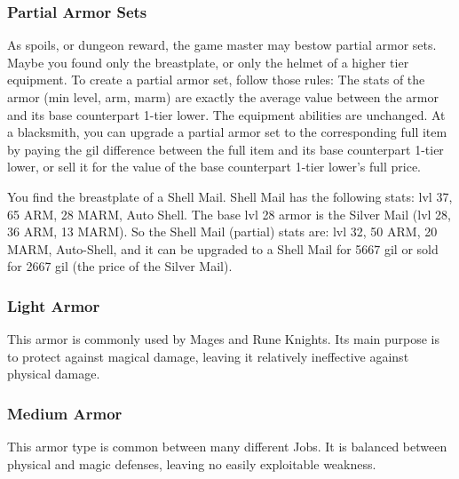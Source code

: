 \begin{multicols}{2}
\subsubsection{Partial Armor Sets}\label{subsec:inv-partial-armor}
As spoils,  or dungeon reward, the game master may bestow partial armor sets. Maybe you found only the breastplate, or only the helmet of a higher tier equipment. To create a partial armor set, follow those rules:
The stats of the armor (min level, arm, marm) are exactly the average value between the armor and its base counterpart 1-tier lower. The equipment abilities are unchanged. At a blacksmith, you can upgrade a partial armor set to the corresponding full item by paying the gil difference between the full item and its base counterpart 1-tier lower, or sell it for the value of the base counterpart 1-tier lower's full price.

\begin{boco}
You find the breastplate of a Shell Mail. Shell Mail has the following stats: lvl 37, 65 ARM, 28 MARM, Auto Shell. The base lvl 28 armor is the Silver Mail (lvl 28, 36 ARM, 13 MARM). So the Shell Mail (partial) stats are: lvl 32, 50 ARM, 20 MARM, Auto-Shell, and it can be upgraded to a Shell Mail for 5667 gil or sold for 2667 gil (the price of the Silver Mail).
\end{boco}

\end{multicols}
\clearpage
\subsubsection{Light Armor}

This armor is commonly used by Mages and Rune Knights. Its main purpose is to protect against magical damage, leaving it relatively ineffective against physical damage.

\begin{tabarm}[label=inv-larm]
    
\end{tabarm}

\clearpage
\subsubsection{Medium Armor}

This armor type is common between many different Jobs.  It is balanced between physical and magic defenses, leaving no easily exploitable weakness.

\begin{tabarm}[label=inv-marm]
    
\end{tabarm}

